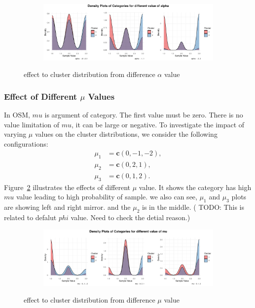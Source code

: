 \documentclass{article}
\begin{document}
\begin{figure}[h]
  \centering
  \begin{subfigure}{1.0\textwidth}
      \centering
      \includegraphics[width=\textwidth]{images/para_sim/alpha.png}
  \end{subfigure}
  \caption{effect to cluster distribution from difference $\alpha$ value}
  \label{fig:alpha}
\end{figure}

\subsubsection*{Effect of Different $\mu$ Values}
In OSM, $mu$ is argument of category. 
The first value must be zero. There is no value limitation of $mu$, it can be large or negative.
To investigate the impact of varying $\mu$ values on the cluster distributions, 
we consider the following configurations:
\[
\begin{aligned}
\mu_1 &= \mathbf{c}(0, -1, -2), \\
\mu_2 &= \mathbf{c}(0, 2, 1), \\
\mu_3 &= \mathbf{c}(0, 1, 2).
\end{aligned}
\]
Figure~\ref{fig:mu} illustrates the effects of different $\mu$ value.
It shows the category has high $mu$ value leading to high probability of sample.
we also can see, $\mu_1$ and $\mu_3$ plots are showing left and right mirror. 
and the $\mu_2$ is in the middle.
( TODO: This is related to defalut $phi$ value. 
Need to check the detial reason.)

\begin{figure}[h]
  \centering
  \begin{subfigure}{1.0\textwidth}
      \centering
      \includegraphics[width=\textwidth]{images/para_sim/mu.png}
  \end{subfigure}
  \caption{effect to cluster distribution from difference $\mu$ value}
  \label{fig:mu}
\end{figure}
\end{document}
